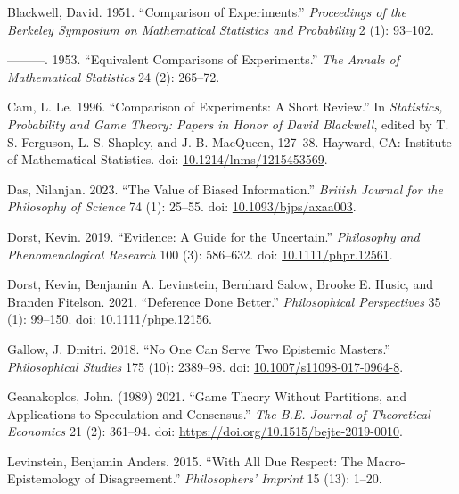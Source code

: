 \documentclass[
  10pt,
  letterpaper,
  DIV=11,
  numbers=noendperiod,
  twoside]{scrartcl}
\newlength{\cslhangindent}
\newenvironment{CSLReferences}[2] %
 {\begin{list}{}{%
  \setlength{\itemindent}{0pt}
  \setlength{\leftmargin}{0pt}
  \setlength{\parsep}{0pt}
  \ifodd #1
   \setlength{\leftmargin}{\cslhangindent}
   \setlength{\itemindent}{-1\cslhangindent}
  \fi
  \setlength{\itemsep}{#2\baselineskip}}}
 {\end{list}}
\begin{document}
\label{refs}
\begin{CSLReferences}{1}{0}
Blackwell, David. 1951. {``Comparison of Experiments.''}
\emph{Proceedings of the Berkeley Symposium on Mathematical Statistics
and Probability} 2 (1): 93--102.

---------. 1953. {``Equivalent Comparisons of Experiments.''} \emph{The
Annals of Mathematical Statistics} 24 (2): 265--72.

Cam, L. Le. 1996. {``Comparison of Experiments: A Short Review.''} In
\emph{Statistics, Probability and Game Theory: Papers in Honor of David
Blackwell}, edited by T. S. Ferguson, L. S. Shapley, and J. B. MacQueen,
127--38. Hayward, CA: Institute of Mathematical Statistics. doi:
\href{https://doi.org/10.1214/lnms/1215453569}{10.1214/lnms/1215453569}.

Das, Nilanjan. 2023. {``The Value of Biased Information.''}
\emph{British Journal for the Philosophy of Science} 74 (1): 25--55.
doi: \href{https://doi.org/10.1093/bjps/axaa003}{10.1093/bjps/axaa003}.

Dorst, Kevin. 2019. {``Evidence: A Guide for the Uncertain.''}
\emph{Philosophy and Phenomenological Research} 100 (3): 586--632. doi:
\href{https://doi.org/10.1111/phpr.12561}{10.1111/phpr.12561}.

Dorst, Kevin, Benjamin A. Levinstein, Bernhard Salow, Brooke E. Husic,
and Branden Fitelson. 2021. {``Deference Done Better.''}
\emph{Philosophical Perspectives} 35 (1): 99--150. doi:
\href{https://doi.org/10.1111/phpe.12156}{10.1111/phpe.12156}.

Gallow, J. Dmitri. 2018. {``No One Can Serve Two Epistemic Masters.''}
\emph{Philosophical Studies} 175 (10): 2389--98. doi:
\href{https://doi.org/10.1007/s11098-017-0964-8}{10.1007/s11098-017-0964-8}.

Geanakoplos, John. (1989) 2021. {``Game Theory Without Partitions, and
Applications to Speculation and Consensus.''} \emph{The B.E. Journal of
Theoretical Economics} 21 (2): 361--94. doi:
\url{https://doi.org/10.1515/bejte-2019-0010}.

Levinstein, Benjamin Anders. 2015. {``With All Due Respect: The
Macro-Epistemology of Disagreement.''} \emph{Philosophers' Imprint} 15
(13): 1--20.


\end{CSLReferences}
\end{document}
